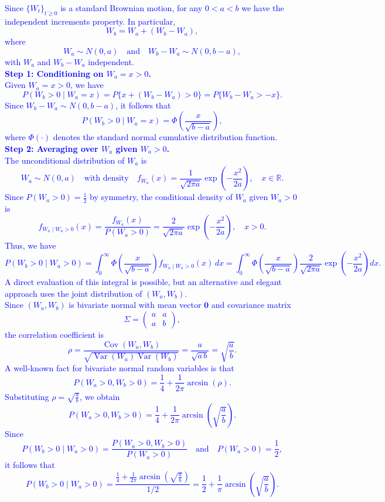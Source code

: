 \documentclass{article}
\begin{document}
\textcolor{blue}{
    Since $\{W_t\}_{t\ge0}$ is a standard Brownian motion, for any $0<a<b$ we have the independent increments property. In particular, 
\[
W_b = W_a + (W_b-W_a),
\]
where
\[
W_a \sim N(0,a) \quad \text{and} \quad W_b-W_a \sim N(0,b-a),
\]
with $W_a$ and $W_b-W_a$ independent. \\
\noindent \textbf{Step 1: Conditioning on $W_a=x>0$.} \\
Given $W_a=x>0$, we have
\[
P(W_b>0 \mid W_a=x) = P\{x+(W_b-W_a)>0\} = P\{W_b-W_a > -x\}.
\]
Since $W_b-W_a \sim N(0,b-a)$, it follows that
\[
P(W_b>0 \mid W_a=x) = \Phi\left(\frac{x}{\sqrt{b-a}}\right),
\]
where $\Phi(\cdot)$ denotes the standard normal cumulative distribution function. \\
\noindent \textbf{Step 2: Averaging over $W_a$ given $W_a>0$.} \\
The unconditional distribution of $W_a$ is 
\[
W_a\sim N(0,a) \quad \text{with density} \quad f_{W_a}(x)=\frac{1}{\sqrt{2\pi a}} \exp\left(-\frac{x^2}{2a}\right), \quad x\in \mathbb{R}.
\]
Since $P(W_a>0)=\frac{1}{2}$ by symmetry, the conditional density of $W_a$ given $W_a>0$ is
\[
f_{W_a\mid W_a>0}(x) = \frac{f_{W_a}(x)}{P(W_a>0)}
= \frac{2}{\sqrt{2\pi a}} \exp\left(-\frac{x^2}{2a}\right), \quad x>0.
\]
Thus, we have
\[
P(W_b>0 \mid W_a>0) = \int_{0}^{\infty} \Phi\left(\frac{x}{\sqrt{b-a}}\right) f_{W_a\mid W_a>0}(x)\,dx = \int_{0}^{\infty} \Phi\left(\frac{x}{\sqrt{b-a}}\right) \frac{2}{\sqrt{2\pi a}} \exp\left(-\frac{x^2}{2a}\right) dx.
\]
A direct evaluation of this integral is possible, but an alternative and elegant approach uses the joint distribution of $(W_a,W_b)$. \\
Since $(W_a,W_b)$ is bivariate normal with mean vector $\mathbf{0}$ and covariance matrix
\[
\Sigma = \begin{pmatrix} a & a \\ a & b \end{pmatrix},
\]
the correlation coefficient is
\[
\rho = \frac{\operatorname{Cov}(W_a,W_b)}{\sqrt{\operatorname{Var}(W_a)\operatorname{Var}(W_b)}} = \frac{a}{\sqrt{a\,b}} = \sqrt{\frac{a}{b}}.
\]
A well-known fact for bivariate normal random variables is that
\[
P(W_a>0, W_b>0) = \frac{1}{4} + \frac{1}{2\pi}\arcsin(\rho).
\]
Substituting $\rho = \sqrt{\frac{a}{b}}$, we obtain
\[
P(W_a>0, W_b>0) = \frac{1}{4} + \frac{1}{2\pi}\arcsin\left(\sqrt{\frac{a}{b}}\right).
\]
Since
\[
P(W_b>0\mid W_a>0) = \frac{P(W_a>0, W_b>0)}{P(W_a>0)} \quad \text{and} \quad P(W_a>0)=\frac{1}{2},
\]
it follows that
\[
P(W_b>0\mid W_a>0) = \frac{\frac{1}{4} + \frac{1}{2\pi}\arcsin\left(\sqrt{\frac{a}{b}}\right)}{1/2} = \frac{1}{2} + \frac{1}{\pi}\arcsin\left(\sqrt{\frac{a}{b}}\right).
\]}
\end{document}
